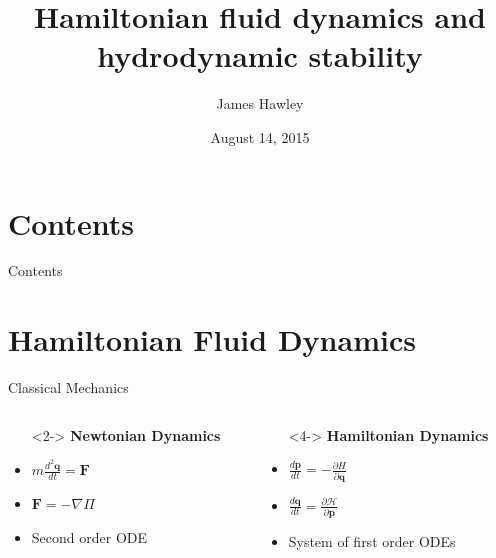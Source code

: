\documentclass{beamer}
\title{Hamiltonian fluid dynamics and hydrodynamic stability}
\author{James Hawley}
\date{August 14, 2015}
\institute{University of Waterloo}
\begin{document}
	\begin{frame}
		\titlepage
	\end{frame}

	\section*{Contents}
		\begin{frame}{Contents}
			\tableofcontents
		\end{frame}

	\section{Hamiltonian Fluid Dynamics}
		\begin{frame}[t]{Classical Mechanics}
			\begin{columns}
				\begin{column}{0.5\textwidth}
					\begin{itemize}
						\item[]<2-> \textbf{Newtonian Dynamics}
						\item<3-> $m\frac{d^2 \mathbf{q}}{dt} = \mathbf{F}$
						\item<3-> $\mathbf{F} = -\nabla \Pi$
						\item<3-> Second order ODE
					\end{itemize}
				\end{column}
				\begin{column}{0.5\textwidth}
					\begin{itemize}
						\item[]<4-> \textbf{Hamiltonian Dynamics}
						\item<5-> $\frac{d \mathbf{p}}{dt} = -\frac{\partial H}{\partial \mathbf{q}}$
						\item<5-> $\frac{d \mathbf{q}}{dt} = \frac{\partial \mathcal{H}}{\partial \mathbf{p}}$
						\item<5-> System of first order ODEs
					\end{itemize}
				\end{column}
			\end{columns}
		\end{frame}
\end{document}
